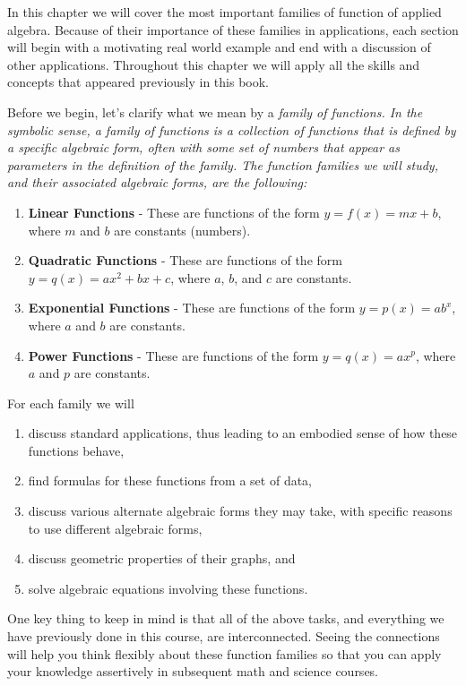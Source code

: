 In this chapter we will cover the most important families of function of applied algebra. Because of their importance of these families in applications, each section will begin with a motivating real world example and end with a discussion of other applications. Throughout this chapter we will apply all the skills and concepts that appeared previously in this book. 

\par 

Before we begin, let's clarify what we mean by a \it{family of functions}\normalfont. In the symbolic sense, a family of functions is a collection of functions that is defined by a specific algebraic form, often with some set of numbers that appear as parameters in the definition of the family. The function families we will study, and their associated algebraic forms, are the following:
\begin{enumerate}
\item {\bf Linear Functions} - These are functions of the form $y = f(x) = mx + b$, where $m$ and $b$ are constants (numbers).
\item {\bf Quadratic Functions} - These are functions of the form $y = q(x) = ax^2+bx+c$, where $a$, $b$, and $c$ are constants.
\item {\bf Exponential Functions} - These are functions of the form $y = p(x) = ab^{x}$, where $a$ and $b$ are constants.
\item {\bf Power Functions} - These are functions of the form $y = q(x) = ax^{p}$, where $a$ and $p$ are constants.
\end{enumerate}

For each family we will
\begin{enumerate}
\item discuss standard applications, thus leading to an embodied sense of how these functions behave,
\item find formulas for these functions from a set of data,
\item discuss various alternate algebraic forms they may take, with specific reasons to use different algebraic forms,
\item discuss geometric properties of their graphs, and
\item solve algebraic equations involving these functions.
\end{enumerate}

One key thing to keep in mind is that all of the above tasks, and everything we have previously done in this course, are interconnected. Seeing the connections will help you think flexibly about these function families so that you can apply your knowledge assertively in subsequent math and science courses.

